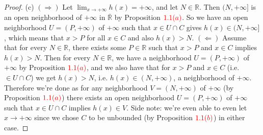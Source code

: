 \documentclass[oneside]{amsart}
\theoremstyle{definition}
\newcommand{\rr}{\mathbb R}
\begin{document}
\begin{tcolorbox}[colback=black!5!white,colframe=black!75!black,title= Exercise $1.1.$]
\begin{proof}
(c) $(\Rightarrow)$ Let $ \lim_{x \to +\infty} h(x) = + \infty$, and let $N \in \rr$. Then $(N, +\infty]$ is an open neighborhood of $+\infty$ in $ \overline{\rr}$ by Proposition $\textcolor{red}{1.1 (a)}$. So we have an open neighborhood $U = (P, +\infty)$ of $+\infty$ such that $x \in U \cap C$ gives $h(x) \in (N, +\infty]$, which means that $x>P$ for all $x \in C$ and also $h(x) > N$. $(\Leftarrow)$ Assume that for every $N \in \rr$, there exists some $P \in \rr$ such that $x > P$ and $x \in C$ implies $h(x) > N$. Then for every $N \in \rr$, we have a neighborhood $ U = (P, +\infty)$ of $+\infty$ by Proposition $\textcolor{red}{1.1 (a)}$, and we also have that for $x > P$ and $x \in C$ (i.e. $ \in U \cap C$) we get $h(x) > N$, i.e. $h(x) \in (N, +\infty)$, a neighborhood of $+\infty$. Therefore we're done as for any neighborhood $ V = (N, +\infty)$ of $+\infty$ (by Proposition $\textcolor{red}{1.1 (a)}$) there exists an open neighborhood $ U = (P, +\infty)$ of $+\infty$ such that $x \in U \cap C$ implies $h(x) \in V$. Side note: we're even able to even let $x \to +\infty$ since we chose $C$ to be unbounded (by Proposition $\textcolor{red}{1.1 (b)}$) in either case.
\end{proof}
\end{tcolorbox}
\end{document}
